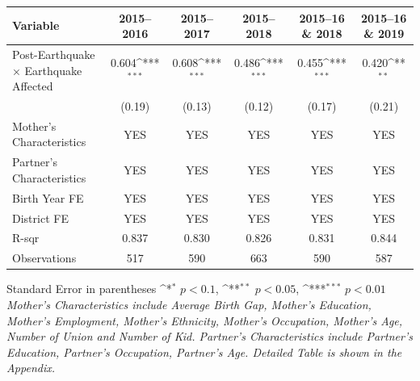 \def\sym#1{\ifmmode^{#1}\else\(^{#1}\)\fi}
\renewcommand{\arraystretch}{1.4}
\small
\setlength{\tabcolsep}{6pt}

\begin{flushleft}
\begin{tabular}{@{}p{4cm}*{5}{c}@{}}
\hline\hline
Variable & 2015--2016 & 2015--2017 & 2015--2018 & 2015--16 \& 2018 & 2015--16 \& 2019 \\
\hline
Post-Earthquake × Earthquake Affected & 0.604\sym{***} & 0.608\sym{***} & 0.486\sym{***} & 0.455\sym{***} & 0.420\sym{**} \\
                                      & (0.19)         & (0.13)         & (0.12)         & (0.17)         & (0.21)         \\
\hline
Mother's Characteristics              & YES            & YES            & YES            & YES            & YES            \\
Partner's Characteristics             & YES            & YES            & YES            & YES            & YES            \\
\hline
Birth Year FE                         & YES            & YES            & YES            & YES            & YES            \\
District FE                           & YES            & YES            & YES            & YES            & YES            \\
R-sqr                                 & 0.837          & 0.830          & 0.826          & 0.831          & 0.844          \\
Observations                          & 517            & 590            & 663            & 590            & 587            \\
\hline\hline
\end{tabular}

\vspace{4pt}
\noindent\footnotesize
Standard Error in parentheses \sym{*} \(p<0.1\), \sym{**} \(p<0.05\), \sym{***} \(p<0.01\)\\
\textit{Mother’s Characteristics include Average Birth Gap, Mother’s Education, Mother’s Employment, Mother’s Ethnicity, Mother’s Occupation, Mother’s Age, Number of Union and Number of Kid. Partner’s Characteristics include Partner’s Education, Partner’s Occupation, Partner’s Age. Detailed Table is shown in the Appendix.}
\end{flushleft}

